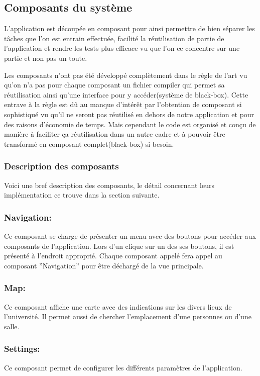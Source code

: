 			 
	\subsection{Composants du système}
		L'application est découpée en composant pour ainsi permettre de bien séparer les tâches que l'on est entrain effectuée, facilité la réutilisation de partie de l'application et rendre les tests plus efficace vu que l'on ce concentre sur une partie et non pas un toute.

		Les composants n'ont pas été développé complètement dans le règle de l'art vu qu'on  n'a pas pour chaque composant un fichier compiler qui permet sa réutilisation ainsi qu'une interface pour y accéder(système de black-box). Cette entrave à la règle est dû au manque d'intérêt par l'obtention de composant si sophistiqué vu qu'il ne seront pas réutilisé en dehors de notre application et pour des raisons d'économie de temps. Mais cependant le code est organisé et conçu de manière à faciliter ça réutilisation dans un autre cadre et à pouvoir être transformé en composant complet(black-box) si besoin.
		
		\subsubsection{Description des composants}
		Voici une bref description des composants, le détail concernant leurs implémentation ce trouve dans la section suivante.
		\subsubsection*{Navigation:}
		Ce composant se charge de présenter un menu avec des boutons pour accéder aux composants de l'application. Lors d'un clique sur un des ses boutons, il est présenté à l'endroit approprié. Chaque composant appelé fera appel au composant ''Navigation'' pour être déchargé de la vue principale.
		\subsubsection*{Map:}
		Ce composant affiche une carte avec des indications sur les divers lieux de l'université. Il permet aussi de chercher l'emplacement d'une personnes ou d'une salle.
		\subsubsection*{Settings:}
		Ce composant permet de configurer les différents paramètres de l'application.
